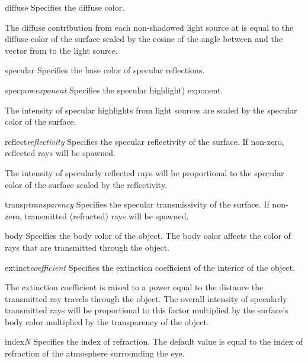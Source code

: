 \begin{defkey}{diffuse}{}
	Specifies the diffuse color.
\end{defkey}
The diffuse contribution from each non-shadowed light source at 
is equal to the diffuse color of the surface scaled by the cosine of
the angle between 
and the vector from  to the light source.

\begin{defkey}{specular}{}
	Specifies the base color of specular reflections.
\end{defkey}

\begin{defkey}{specpow}{{\em exponent}}
	Specifies the specular highlight) exponent.
\end{defkey}
The intensity of specular highlights from light sources are
scaled by the specular color of the surface.

\begin{defkey}{reflect}{{\em reflectivity}}
	Specifies the specular reflectivity of the surface.  If non-zero,
	reflected rays will be spawned.
\end{defkey}
The intensity of specularly reflected rays will be proportional to
the specular color of the surface scaled by the reflectivity.

\begin{defkey}{transp}{{\em transparency}}
	Specifies the specular transmissivity of the surface.  If
	non-zero,
	transmitted (refracted) rays will be spawned.
\end{defkey}

\begin{defkey}{body}{}
	Specifies the body color of the object.  The body color
	affects the color of rays that are transmitted through the
	object.
\end{defkey}

\begin{defkey}{extinct}{{\em coefficient}}
	Specifies the extinction coefficient of the interior
	of the object.
\end{defkey}
The extinction coefficient is raised to a power equal to the distance
the transmitted ray travels through the object.
The overall intensity of specularly transmitted rays will be proportional to
this factor multiplied by the surface's body color
multiplied by the transparency of the object.

\begin{defkey}{index}{{\em N}}
	Specifies the index of refraction.  The default value is equal
	to the index of refraction of the atmosphere surrounding the eye.
\end{defkey}

